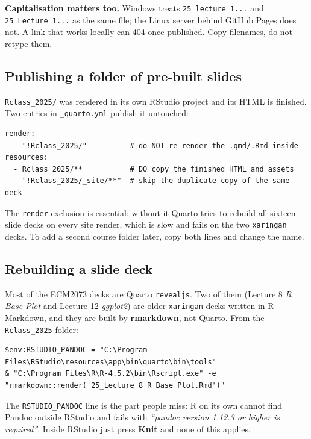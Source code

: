 \documentclass[11pt,a4paper]{article}
\newcommand{\file}[1]{\texttt{#1}}
\begin{document}
\textbf{Capitalisation matters too.} Windows treats
\file{25\_lecture 1...} and \file{25\_Lecture 1...} as the same file;
the Linux server behind GitHub Pages does not. A link that works locally
can 404 once published. Copy filenames, do not retype them.

\subsection{Publishing a folder of pre-built slides}

\file{Rclass\_2025/} was rendered in its own RStudio project and its HTML is
finished. Two entries in \file{\_quarto.yml} publish it untouched:

\begin{lstlisting}
render:
  - "!Rclass_2025/"          # do NOT re-render the .qmd/.Rmd inside
resources:
  - Rclass_2025/**           # DO copy the finished HTML and assets
  - "!Rclass_2025/_site/**"  # skip the duplicate copy of the same deck
\end{lstlisting}

The \texttt{render} exclusion is essential: without it Quarto tries to
rebuild all sixteen slide decks on every site render, which is slow and
fails on the two \texttt{xaringan} decks. To add a second course folder
later, copy both lines and change the name.

\subsection{Rebuilding a slide deck}\label{sec:xaringan}

Most of the ECM2073 decks are Quarto \texttt{revealjs}. Two of them
(Lecture 8 \emph{R Base Plot} and Lecture 12 \emph{ggplot2}) are older
\texttt{xaringan} decks written in R Markdown, and they are built by
\textbf{rmarkdown}, not Quarto. From the \file{Rclass\_2025} folder:

\begin{lstlisting}
$env:RSTUDIO_PANDOC = "C:\Program Files\RStudio\resources\app\bin\quarto\bin\tools"
& "C:\Program Files\R\R-4.5.2\bin\Rscript.exe" -e "rmarkdown::render('25_Lecture 8 R Base Plot.Rmd')"
\end{lstlisting}

The \texttt{RSTUDIO\_PANDOC} line is the part people miss: R on its own
cannot find Pandoc outside RStudio and fails with \emph{``pandoc version
1.12.3 or higher is required''}. Inside RStudio just press \textbf{Knit}
and none of this applies.
\end{document}
